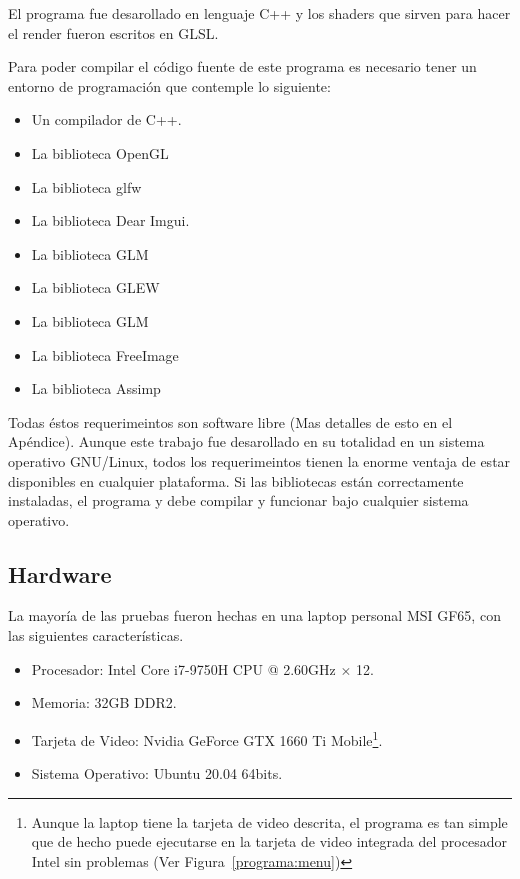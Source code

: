 El programa fue desarollado en lenguaje C++ y los shaders que sirven para hacer el render fueron escritos en GLSL.

Para poder compilar el código fuente de este programa es necesario tener un entorno de programación que contemple lo siguiente:

\begin{itemize}
 \item Un compilador de C++.
 \item La biblioteca OpenGL
 \item La biblioteca glfw
 \item La biblioteca Dear Imgui.
 \item La biblioteca GLM
 \item La biblioteca GLEW
 \item La biblioteca GLM
 \item La biblioteca FreeImage
 \item La biblioteca Assimp
\end{itemize}

Todas éstos requerimeintos son software libre (Mas detalles de esto en el Apéndice).
Aunque este trabajo fue desarollado en su totalidad en un sistema operativo GNU/Linux, todos los requerimeintos tienen la enorme ventaja de estar disponibles en cualquier plataforma.
Si las bibliotecas están correctamente instaladas, el programa y debe compilar y funcionar bajo cualquier sistema operativo.

\subsection{Hardware}
La mayoría de las pruebas fueron hechas en una laptop personal MSI GF65, con las siguientes características.

\begin{itemize}
\label{maquina:trabajo} 
 \item Procesador: Intel Core i7-9750H CPU @ 2.60GHz $\times$ 12.
 \item Memoria: 32GB DDR2.
 \item Tarjeta de Video: Nvidia GeForce GTX 1660 Ti Mobile\footnote{Aunque la laptop tiene la tarjeta de video descrita, el programa es tan simple que de hecho puede ejecutarse en la tarjeta de video integrada del procesador Intel sin problemas (Ver Figura~\ref{programa:menu})}.
 \item Sistema Operativo: Ubuntu 20.04 64bits.
\end{itemize}

